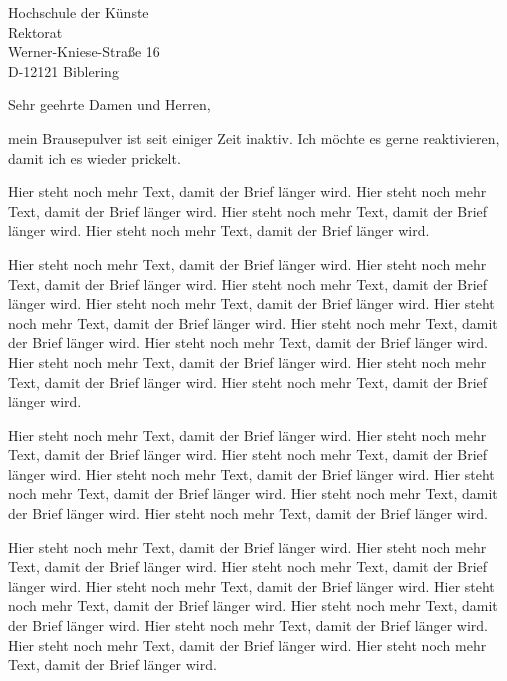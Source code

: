 \documentclass{scrlttr2}
\begin{document}

      


\begin{letter}{Hochschule der Künste\\
      Rektorat\\
      Werner-Kniese-Straße 16\\
      D-12121 Biblering}

  
\opening{Sehr geehrte Damen und Herren,}

mein Brausepulver ist seit einiger Zeit inaktiv. 
Ich möchte es gerne reaktivieren, 
damit ich es wieder prickelt.

Hier steht noch mehr Text, damit der Brief länger wird.
Hier steht noch mehr Text, damit der Brief länger wird.
Hier steht noch mehr Text, damit der Brief länger wird.
Hier steht noch mehr Text, damit der Brief länger wird.

Hier steht noch mehr Text, damit der Brief länger wird.
Hier steht noch mehr Text, damit der Brief länger wird.
Hier steht noch mehr Text, damit der Brief länger wird.
Hier steht noch mehr Text, damit der Brief länger wird.
Hier steht noch mehr Text, damit der Brief länger wird.
Hier steht noch mehr Text, damit der Brief länger wird.
Hier steht noch mehr Text, damit der Brief länger wird.
Hier steht noch mehr Text, damit der Brief länger wird.
Hier steht noch mehr Text, damit der Brief länger wird.
Hier steht noch mehr Text, damit der Brief länger wird.

Hier steht noch mehr Text, damit der Brief länger wird.
Hier steht noch mehr Text, damit der Brief länger wird.
Hier steht noch mehr Text, damit der Brief länger wird.
Hier steht noch mehr Text, damit der Brief länger wird.
Hier steht noch mehr Text, damit der Brief länger wird.
Hier steht noch mehr Text, damit der Brief länger wird.
Hier steht noch mehr Text, damit der Brief länger wird.

Hier steht noch mehr Text, damit der Brief länger wird.
Hier steht noch mehr Text, damit der Brief länger wird.
Hier steht noch mehr Text, damit der Brief länger wird.
Hier steht noch mehr Text, damit der Brief länger wird.
Hier steht noch mehr Text, damit der Brief länger wird.
Hier steht noch mehr Text, damit der Brief länger wird.
Hier steht noch mehr Text, damit der Brief länger wird.
Hier steht noch mehr Text, damit der Brief länger wird.
Hier steht noch mehr Text, damit der Brief länger wird.


\end{letter}
\end{document}
